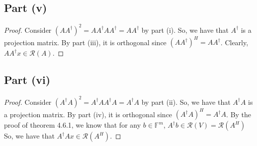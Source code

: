 \documentclass{article}
\begin{document}
\subsection*{Part (v)}

\begin{proof}
Consider $(AA^{\dagger})^2 = AA^{\dagger}AA^{\dagger} = AA^{\dagger}$ by part (i). So, we have that $A^{\dagger}$ is a projection matrix. By part (iii), it is orthogonal since $(AA^{\dagger})^H = AA^{\dagger}$. Clearly, $AA^{\dagger}x \in \mathcal{R}(A)$.
\end{proof}

\subsection*{Part (vi)}

\begin{proof}
Consider $(A^{\dagger}A)^2 = A^{\dagger}AA^{\dagger}A = A^{\dagger}A$ by part (ii). So, we have that $A^{\dagger}A$ is a projection matrix. By part (iv), it is orthogonal since $(A^{\dagger}A)^{H} = A^{\dagger}A$. By the proof of theorem 4.6.1, we know that for any $b \in \mathbb{F}^m$, $A^{\dagger}b \in \mathcal{R}(V) = \mathcal{R}(A^{H})$ So, we have that $A^{\dagger}Ax \in \mathcal{R}(A^{H})$.
\end{proof}
\end{document}
